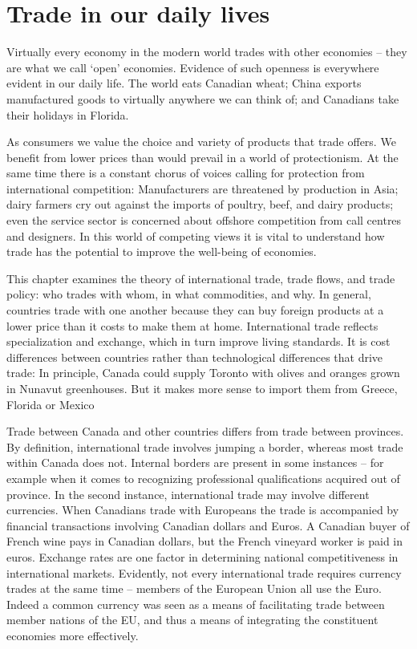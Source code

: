 \section{Trade in our daily lives}\label{sec:ch15sec1}

Virtually every economy in the modern world trades with other economies -- they are what we call `open' economies. Evidence of such openness is everywhere evident in our daily life. The world eats Canadian wheat; China exports manufactured goods to virtually anywhere we can think of; and Canadians take their holidays in Florida.

As consumers we value the choice and variety of products that trade offers. We benefit from lower prices than would prevail in a world of protectionism. At the same time there is a constant chorus of voices calling for protection from international competition: Manufacturers are threatened by production in Asia; dairy farmers cry out against the imports of poultry, beef, and dairy products; even the service sector is concerned about offshore competition from call centres and designers. In this world of competing views it is vital to understand how trade has the potential to improve the well-being of economies.

This chapter examines the theory of international trade, trade flows, and trade policy: who trades with whom, in what commodities, and why. In general, countries trade with one another because they can buy foreign products at a lower price than it costs to make them at home. International trade reflects specialization and exchange, which in turn improve living standards. It is cost differences between countries rather than technological differences that drive trade: In principle, Canada could supply Toronto with olives and oranges grown in Nunavut greenhouses. But it makes more sense to import them from Greece, Florida or Mexico

Trade between Canada and other countries differs from trade between provinces. By definition, international trade involves jumping a border, whereas most trade within Canada does not. Internal borders are present in some instances -- for example when it comes to recognizing professional qualifications acquired out of province. In the second instance, international trade may involve different currencies. When Canadians trade with Europeans the trade is accompanied by financial transactions involving Canadian dollars and Euros. A Canadian buyer of French wine pays in Canadian dollars, but the French vineyard worker is paid in euros. Exchange rates are one factor in determining national competitiveness in international markets. Evidently, not every international trade requires currency trades at the same time -- members of the European Union all use the Euro. Indeed a common currency was seen as a means of facilitating trade between member nations of the EU, and thus a means of integrating the constituent economies more effectively.